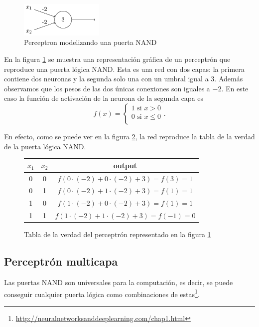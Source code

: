 \documentclass{article}
\begin{document}

\begin{figure}[htbp]
\centering
\includegraphics[width=4cm]{imagenes/NAND.png}
\caption{Perceptron modelizando una puerta NAND}
\label{fig:red_nand}
\end{figure}
En la figura \ref{fig:red_nand} se muestra una representación gráfica de un perceptrón que reproduce una puerta lógica NAND.
Esta es una red con dos capas: la primera contiene dos neuronas y la segunda solo una con un umbral igual a $3$. Además observamos que los pesos de las dos únicas conexiones son iguales a $-2$. En este caso la función de activación de la neurona de la segunda capa es 
$$f(x)=\begin{cases}
1 \text{ si } x>0\\
0 \text{ si } x\leq 0\\
\end{cases}.$$

En efecto, como se puede ver en la figura \ref{fig:tabla_verdad}, la red reproduce la tabla de la verdad de la puerta lógica NAND.\\
\begin{figure}[htbp]
\centering
\begin{tabular}{ |c|c|c| } 
 $x_1$ & $x_2$ & output \\ 
 \hline
 0 & 0 & $f(0\cdot (-2)+0\cdot (-2)+3)=f(3)=1$ \\ 
 0 & 1 & $f(0\cdot (-2)+1\cdot (-2)+3)=f(1)=1$ \\ 
 1 & 0 & $f(1\cdot (-2)+0\cdot (-2)+3)=f(1)=1$ \\ 
 1 & 1 & $f(1\cdot (-2)+1\cdot (-2)+3)=f(-1)=0$ 
\end{tabular}
\caption{Tabla de la verdad del perceptrón representado en la figura \ref{fig:red_nand}}
\label{fig:tabla_verdad}
\end{figure}



\subsection{Perceptrón multicapa}
Las puertas NAND son universales para la computación, es decir, se puede conseguir cualquier puerta lógica como combinaciones de estas\footnote{\url{http://neuralnetworksanddeeplearning.com/chap1.html}}.
\end{document}
